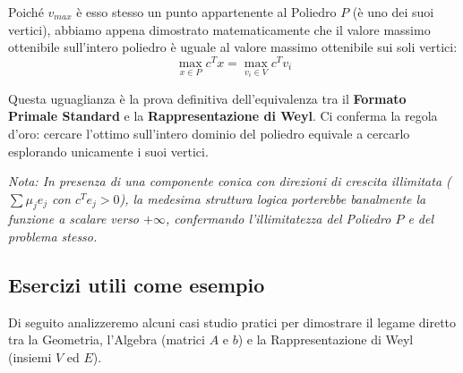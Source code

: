 \documentclass[12pt, a4paper]{article}
\begin{document}
	Poiché $v_{max}$ è esso stesso un punto appartenente al Poliedro $P$ (è uno dei suoi vertici), abbiamo appena dimostrato matematicamente che il valore massimo ottenibile sull'intero poliedro è uguale al valore massimo ottenibile sui soli vertici:
	\[
	\max_{x \in P} c^T x = \max_{v_i \in V} c^T v_i
	\]
	
	Questa uguaglianza è la prova definitiva dell'equivalenza tra il \textbf{Formato Primale Standard} e la \textbf{Rappresentazione di Weyl}. Ci conferma la regola d'oro: cercare l'ottimo sull'intero dominio del poliedro equivale a cercarlo esplorando unicamente i suoi vertici. 
	
	\vspace{0.2cm}
	\textit{Nota: In presenza di una componente conica con direzioni di crescita illimitata ($\sum \mu_j e_j$ con $c^T e_j > 0$), la medesima struttura logica porterebbe banalmente la funzione a scalare verso $+\infty$, confermando l'illimitatezza del Poliedro $P$ e del problema stesso.}
	
	\vspace{0.3cm}
	
	\subsection*{Esercizi utili come esempio}
	Di seguito analizzeremo alcuni casi studio pratici per dimostrare il legame diretto tra la Geometria, l'Algebra (matrici $A$ e $b$) e la Rappresentazione di Weyl (insiemi $V$ ed $E$).
	
\end{document}
